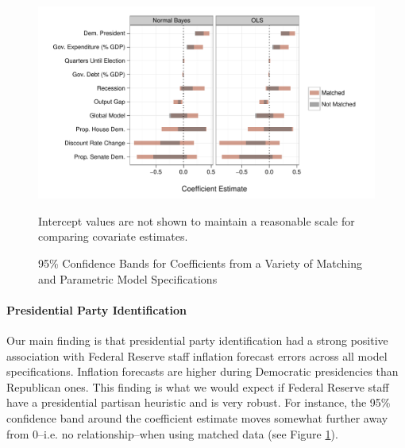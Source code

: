 \documentclass[a4paper]{article}\usepackage{graphicx, color}
\newenvironment{knitrout}{}{} %
\begin{document}
\begin{figure}[t]
    \caption{95\% Confidence Bands for Coefficients from a Variety of Matching and Parametric Model Specifications}
    \label{CoefComparePlots}
    \begin{center}

\begin{knitrout}
\color{fgcolor}\includegraphics[width=0.95\linewidth]{figure/CoefComparePlots} 
\end{knitrout}

    \end{center}
    \begin{singlespace}
        {\scriptsize{Intercept values are not shown to maintain a reasonable scale for comparing covariate estimates.}}
    \end{singlespace}
\end{figure}

\paragraph{Presidential Party Identification}

Our main finding is that presidential party identification had a strong positive association with Federal Reserve staff inflation forecast errors across all model specifications. Inflation forecasts are higher during Democratic presidencies than Republican ones. This finding is what we would expect if Federal Reserve staff have a presidential partisan heuristic and is very robust. For instance, the 95\% confidence band around the coefficient estimate moves somewhat further away from 0--i.e. no relationship--when using matched data (see Figure \ref{CoefComparePlots}).  
\end{document}
